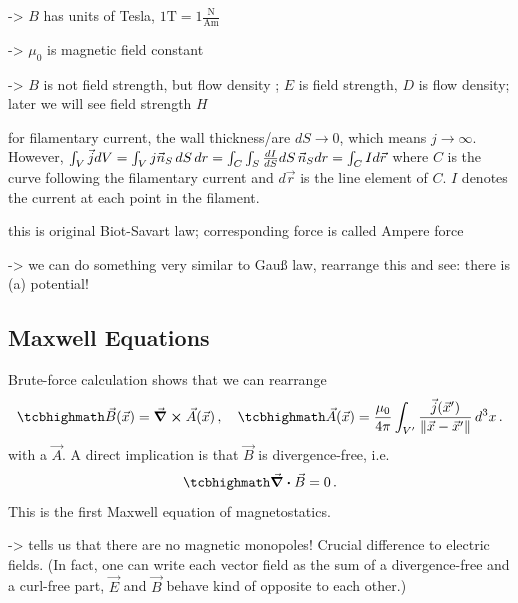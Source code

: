 \documentclass[../class_mech_main.tex]{subfiles}
\DeclareMathOperator{\fpmu}{\frac{\mu_0}{4 \pi}}
\begin{document}
-> $B$ has units of Tesla, $1 \mathrm{T} = 1 \frac{\mathrm{N}}{\mathrm{A} \mathrm{m}}$

-> $\mu_0$ is magnetic field constant

-> $B$ is not field strength, but flow density ; $E$ is field strength, $D$ is flow density; later we will see field strength $H$


\begin{ex}
    for filamentary current, the wall thickness/are $dS \rightarrow 0$, which means $j \rightarrow \infty$. However, $\int_V \vec{j} dV = \int_V j \vec{n}_S \, dS \, dr = \int_C \int_S \dv{I}{S} dS \, \vec{n}_S dr = \int_C I d\vec{r}$ where $C$ is the curve following the filamentary current and $d\vec{r}$ is the line element of $C$. $I$ denotes the current at each point in the filament.

    this is original Biot-Savart law; corresponding force is called Ampere force
\end{ex}

-> we can do something very similar to Gauß law, rearrange this and see: there is (a) potential!



        \subsection{Maxwell Equations}
Brute-force calculation shows that we can rearrange
\begin{equation}
    \eqbox{
        \vec{B}(\vec{x}) = \curl \vec{A}(\vec{x})
    }
    \, , \quad
    \eqbox{
        \vec{A}(\vec{x}) = \fpmu \int_{V'} \frac{\vec{j}(\vec{x}')}{\norm{\vec{x} - \vec{x}'}} \, d^3x
    } \, .
\end{equation}
with a  $\vec{A}$. A direct implication is that $\vec{B}$ is divergence-free, i.e.
\begin{equation}\label{eq:maxwell_magnstat_one_diff}
    \eqbox{
        \div \vec{B} = 0
    } \, .
\end{equation}
This is the first Maxwell equation of magnetostatics.

-> tells us that there are no magnetic monopoles! Crucial difference to electric fields. (In fact, one can write each vector field as the sum of a divergence-free and a curl-free part, $\vec{E}$ and $\vec{B}$ behave kind of opposite to each other.)
\end{document}
